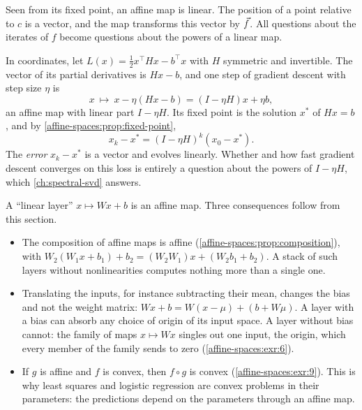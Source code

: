 \begin{notechapter}
\begin{intuition}
Seen from its fixed point, an affine map is linear. The position of a
point relative to $c$ is a vector, and the map transforms this vector by
$\vec{f}$. All questions about the iterates of $f$ become questions about
the powers of a linear map.
\end{intuition}

\begin{example}
\label{affine-spaces:ex:quadratic}
In coordinates, let $L(x) = \frac12x^\top Hx - b^\top x$ with $H$ symmetric
and invertible. The vector of its partial derivatives is $Hx - b$, and one
step of gradient descent with step size $\eta$ is
\[
  x\ \longmapsto\ x - \eta(Hx - b) = (I - \eta H)x + \eta b ,
\]
an affine map with linear part $I - \eta H$. Its fixed point is the
solution $x^*$ of $Hx = b$, and by \cref{affine-spaces:prop:fixed-point},
\[
  x_k - x^* = (I - \eta H)^k(x_0 - x^*) .
\]
The \emph{error} $x_k - x^*$ is a vector and evolves linearly. Whether and
how fast gradient descent converges on this loss is entirely a question
about the powers of $I - \eta H$, which \cref{ch:spectral-svd} answers.
\end{example}

\begin{mlthread}
A ``linear layer'' $x\mapsto Wx + b$ is an affine map. Three consequences
follow from this section.
\begin{itemize}[nosep]
  \item The composition of affine maps is affine
        (\cref{affine-spaces:prop:composition}), with
        $W_2(W_1x + b_1) + b_2 = (W_2W_1)x + (W_2b_1 + b_2)$. A stack of such
        layers without nonlinearities computes nothing more than a single
        one.
  \item Translating the inputs, for instance subtracting their mean,
        changes the bias and not the weight matrix: $Wx + b
        = W(x - \mu) + (b + W\mu)$. A layer with a bias can absorb any
        choice of origin of its input space. A layer without bias cannot:
        the family of maps $x\mapsto Wx$ singles out one input, the
        origin, which every member of the family sends to zero
        (\cref{affine-spaces:exr:6}).
  \item If $g$ is affine and $f$ is convex, then $f\circ g$ is convex
        (\cref{affine-spaces:exr:9}). This is why least squares and
        logistic regression are convex problems in their parameters: the
        predictions depend on the parameters through an affine map.
\end{itemize}
\end{mlthread}


\end{notechapter}
